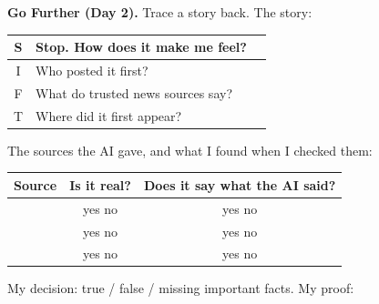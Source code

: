 \documentclass[11pt]{article}
\begin{document}
\vspace{0.6em}

\newpage

{\large\textbf{Go Further (Day 2).}} Trace a story back. The story: 

\vspace{0.3em}
\begin{tabular}{|c|R{2.0in}|R{4.0in}|}
\hline
S & Stop. How does it make me feel? & \\[1.0em] \hline
I & Who posted it first? & \\[1.0em] \hline
F & What do trusted news sources say? & \\[1.0em] \hline
T & Where did it first appear? & \\[1.0em] \hline
\end{tabular}

\vspace{0.8em}
The sources the AI gave, and what I found when I checked them:

\vspace{0.3em}
\begin{tabular}{|R{3.0in}|c|c|}
\hline
\textbf{Source} & \textbf{Is it real?} & \textbf{Does it say what the AI said?} \\ \hline
 & yes \quad no & yes \quad no \\[0.4em] \hline
 & yes \quad no & yes \quad no \\[0.4em] \hline
 & yes \quad no & yes \quad no \\[0.4em] \hline
\end{tabular}

\vspace{0.8em}
My decision: true / false / missing important facts. My proof: 
\end{document}
